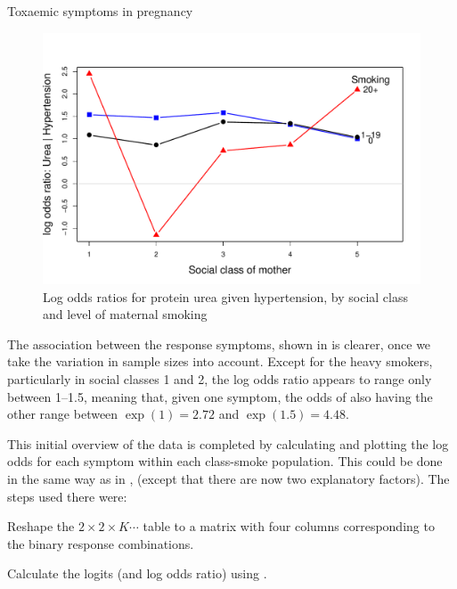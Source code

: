 \documentclass[11pt]{book}\usepackage[]{graphicx}\usepackage[]{color}
\newenvironment{knitrout}{}{} %
\renewenvironment{knitrout}{\small\renewcommand{\baselinestretch}{.85}}{} %
\begin{document}
\begin{Example}[toxaemia]{Toxaemic symptoms in pregnancy}
\begin{knitrout}
\begin{figure}[!htbp]
\centerline{\includegraphics[width=.75\textwidth]{ch08/fig/tox-LOR-1} }

\caption[Log odds ratios for protein urea given hypertension, by social class and level of maternal smoking]{Log odds ratios for protein urea given hypertension, by social class and level of maternal smoking\label{fig:tox-LOR}}
\end{figure}


\end{knitrout}
The association between the response symptoms,
shown in 
is clearer, once we take the variation in sample sizes into account.
Except for the heavy smokers, particularly  in social classes 1 and 2, the log odds ratio
appears to range only between 1--1.5, meaning that, given one symptom,
the odds of also having the other range between $\exp(1)=2.72$ and $\exp(1.5)=4.48$.

This initial overview of the data is completed
by calculating and plotting the log odds for each
symptom within each class-smoke population.
This could be done in the same way as in ,
(except that there are now two explanatory factors).
The steps used there were:
\begin{seriate}
 \item Reshape the $2 \times 2 \times K \cdots$ table to a matrix
 with four columns corresponding to the binary response combinations.
 \item Calculate the logits (and log odds ratio) using .
\end{seriate}


\end{Example}
\end{document}
